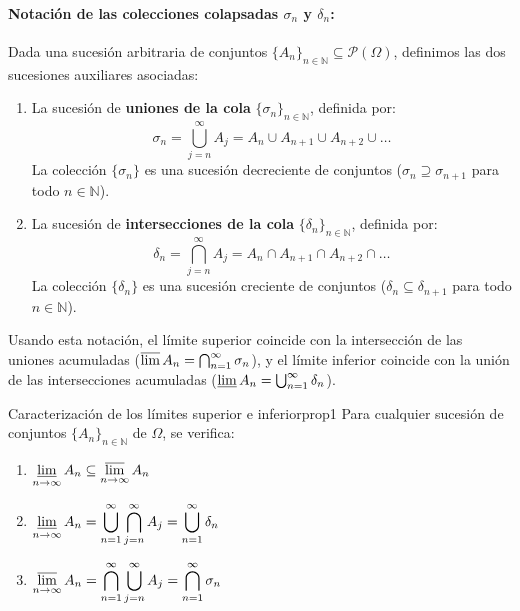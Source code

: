 \paragraph{Notación de las colecciones colapsadas $\sigma_n$ y $\delta_n$:}
Dada una sucesión arbitraria de conjuntos $\{A_n\}_{n \in \mathbb{N}} \subseteq \mathcal{P}(\Omega)$, definimos las dos sucesiones auxiliares asociadas:
\begin{enumerate}
    \item La sucesión de \textbf{uniones de la cola} $\{\sigma_n\}_{n \in \mathbb{N}}$, definida por:
    \[
        \sigma_n = \bigcup_{j=n}^\infty A_j = A_n \cup A_{n+1} \cup A_{n+2} \cup \dots
    \]
    La colección $\{\sigma_n\}$ es una sucesión decreciente de conjuntos ($\sigma_n \supseteq \sigma_{n+1}$ para todo $n \in \mathbb{N}$).

    \item La sucesión de \textbf{intersecciones de la cola} $\{\delta_n\}_{n \in \mathbb{N}}$, definida por:
    \[
        \delta_n = \bigcap_{j=n}^\infty A_j = A_n \cap A_{n+1} \cap A_{n+2} \cap \dots
    \]
    La colección $\{\delta_n\}$ es una sucesión creciente de conjuntos ($\delta_n \subseteq \delta_{n+1}$ para todo $n \in \mathbb{N}$).
\end{enumerate}

Usando esta notación, el límite superior coincide con la intersección de las uniones acumuladas ($\varlimsup A_n = \bigcap_{n=1}^\infty \sigma_n$), y el límite inferior coincide con la unión de las intersecciones acumuladas ($\varliminf A_n = \bigcup_{n=1}^\infty \delta_n$).

\newpage

\begin{proposicion}{Caracterización de los límites superior e inferior}{prop1}
Para cualquier sucesión de conjuntos $\{A_n\}_{n \in \mathbb{N}}$ de $\Omega$, se verifica:
\begin{enumerate}[label=\alph*)]
    \item $\displaystyle \varliminf_{n \to \infty} A_n \subseteq \varlimsup_{n \to \infty} A_n$
    \item $\displaystyle \varliminf_{n \to \infty} A_n = \bigcup_{n=1}^\infty \bigcap_{j=n}^\infty A_j = \bigcup_{n=1}^\infty \delta_n$
    \item $\displaystyle \varlimsup_{n \to \infty} A_n = \bigcap_{n=1}^\infty \bigcup_{j=n}^\infty A_j = \bigcap_{n=1}^\infty \sigma_n$
\end{enumerate}
\end{proposicion}

